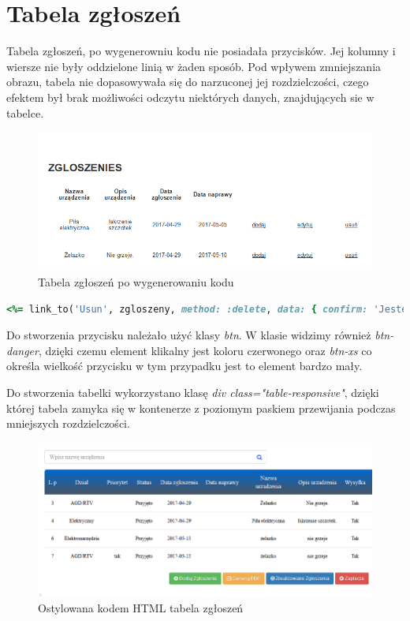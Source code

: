 \documentclass[openright]{xmgr}
\begin{document}
	\section{Tabela zgłoszeń}
	
	Tabela zgłoszeń, po wygenerowniu kodu nie posiadała przycisków. Jej kolumny i wiersze nie były oddzielone linią w żaden sposób. Pod wpływem zmniejszania obrazu, tabela nie dopasowywała się do narzuconej jej rozdzielczości, czego efektem był brak możliwości odczytu niektórych danych, znajdujących sie w tabelce. 
	
	\begin{figure}[!tbh]
		\centering
		\includegraphics[width=\linewidth]{image/zgloszenie}
		\caption{Tabela zgłoszeń po wygenerowaniu kodu}
	\end{figure}
	
	\begin{lstlisting}[language=Ruby,lineskip={-1pt},caption=Element klikalny w tabeli zgłoszeń]
	<%= link_to('Usun', zgloszeny, method: :delete, data: { confirm: 'Jestes pewny?' }, class:'btn btn-danger btn-xs') %>
	\end{lstlisting}
	
	Do stworzenia przycisku należało użyć klasy \textit{btn}. W klasie widzimy również \textit{btn-danger}, dzięki czemu element klikalny jest koloru czerwonego oraz \textit{btn-xs} co określa wielkość przycisku w tym przypadku jest to element bardzo mały. 
	\newpage

	Do stworzenia tabelki wykorzystano klasę \textit{div class="table-responsive"}, dzięki której tabela zamyka się w kontenerze z poziomym paskiem przewijania podczas mniejszych rozdzielczości.
		
	\begin{figure}[!tbh]
		\centering
		\includegraphics[width=\linewidth]{image/table2}
		\caption{Ostylowana kodem HTML tabela zgłoszeń}
	\end{figure}
	
\end{document}
